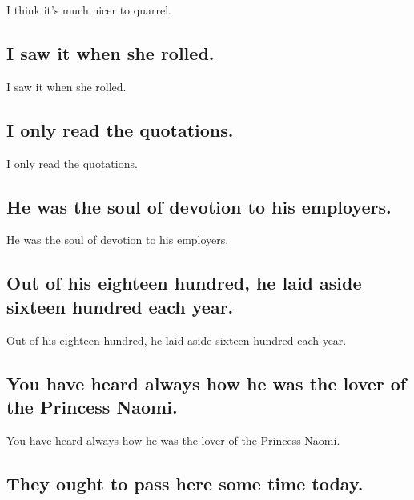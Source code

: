 \documentclass[]{article}
\begin{document}
I think it's much nicer to quarrel.

\hypertarget{i-saw-it-when-she-rolled.}{%
\subsection{I saw it when she rolled.}\label{i-saw-it-when-she-rolled.}}

I saw it when she rolled.

\hypertarget{i-only-read-the-quotations.}{%
\subsection{I only read the
quotations.}\label{i-only-read-the-quotations.}}

I only read the quotations.

\hypertarget{he-was-the-soul-of-devotion-to-his-employers.}{%
\subsection{He was the soul of devotion to his
employers.}\label{he-was-the-soul-of-devotion-to-his-employers.}}

He was the soul of devotion to his employers.

\hypertarget{out-of-his-eighteen-hundred-he-laid-aside-sixteen-hundred-each-year.}{%
\subsection{Out of his eighteen hundred, he laid aside sixteen hundred
each
year.}\label{out-of-his-eighteen-hundred-he-laid-aside-sixteen-hundred-each-year.}}

Out of his eighteen hundred, he laid aside sixteen hundred each year.

\hypertarget{you-have-heard-always-how-he-was-the-lover-of-the-princess-naomi.}{%
\subsection{You have heard always how he was the lover of the Princess
Naomi.}\label{you-have-heard-always-how-he-was-the-lover-of-the-princess-naomi.}}

You have heard always how he was the lover of the Princess Naomi.

\hypertarget{they-ought-to-pass-here-some-time-today.}{%
\subsection{They ought to pass here some time
today.}\label{they-ought-to-pass-here-some-time-today.}}
\end{document}
